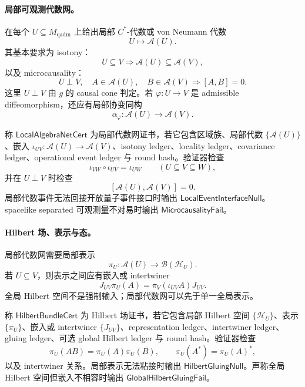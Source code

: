 \paragraph{局部可观测代数网。}
在每个 \(U\subseteq M_{\mathrm{qadm}}\) 上给出局部 \(C^*\)-代数或 von Neumann 代数
\[
U\longmapsto\mathcal A(U).
\]
其基本要求为 isotony：
\[
U\subseteq V\Longrightarrow \mathcal A(U)\subseteq\mathcal A(V),
\]
以及 microcausality：
\[
U\perp V,\quad A\in\mathcal A(U),\quad B\in\mathcal A(V)
\Longrightarrow
[A,B]=0.
\]
这里 \(U\perp V\) 由 \(g\) 的 causal cone 判定。若 \(\varphi:U\to V\) 是 admissible diffeomorphism，还应有局部协变同构
\[
\alpha_\varphi:\mathcal A(U)\to\mathcal A(V).
\]

\begin{definition}[局部代数网证书]\label{def:typed-address-biaxial-completion-local-algebra-net-cert}
称 \(\mathsf{LocalAlgebraNetCert}\) 为局部代数网证书，若它包含区域族、局部代数 \(\{\mathcal A(U)\}\)、嵌入 \(\iota_{UV}:\mathcal A(U)\to\mathcal A(V)\)、isotony ledger、locality ledger、covariance ledger、operational event ledger 与 round hash。验证器检查
\[
\iota_{VW}\circ\iota_{UV}=\iota_{UW}
\qquad(U\subseteq V\subseteq W),
\]
并在 \(U\perp V\) 时检查
\[
[\mathcal A(U),\mathcal A(V)]=0.
\]
局部代数事件无法回接开放量子事件接口时输出 \(\mathsf{LocalEventInterfaceNull}\)。spacelike separated 可观测量不对易时输出 \(\mathsf{MicrocausalityFail}\)。
\end{definition}

\paragraph{Hilbert 场、表示与态。}
局部代数网需要局部表示
\[
\pi_U:\mathcal A(U)\to\mathcal B(\mathcal H_U).
\]
若 \(U\subseteq V\)，则表示之间应有嵌入或 intertwiner
\[
J_{UV}\pi_U(A)
=
\pi_V(\iota_{UV}A)J_{UV}.
\]
全局 Hilbert 空间不是强制输入；局部代数网可以先于单一全局表示。

\begin{definition}\label{def:typed-address-biaxial-completion-hilbert-bundle-cert}
称 \(\mathsf{HilbertBundleCert}\) 为 Hilbert 场证书，若它包含局部 Hilbert 空间 \(\{\mathcal H_U\}\)、表示 \(\{\pi_U\}\)、嵌入或 intertwiner \(\{J_{UV}\}\)、representation ledger、intertwiner ledger、gluing ledger、可选 global Hilbert ledger 与 round hash。验证器检查
\[
\pi_U(AB)=\pi_U(A)\pi_U(B),
\qquad
\pi_U(A^*)=\pi_U(A)^*,
\]
以及 intertwiner 关系。局部表示无法粘接时输出 \(\mathsf{HilbertGluingNull}\)。声称全局 Hilbert 空间但嵌入不相容时输出 \(\mathsf{GlobalHilbertGluingFail}\)。
\end{definition}

